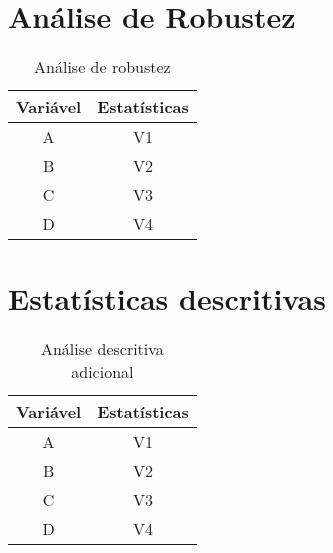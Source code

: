 \begin{apendicesenv}

\chapter{Análise de Robustez}

\begin{table}[H]
    \centering
    \caption{Análise de robustez}
    \begin{tabular}{c|c}
    \hline
         \textbf{Variável} & \textbf{Estatísticas}  \\ \hline
         A & V1\\
         B & V2\\
         C & V3\\
         D & V4\\ \hline
    \end{tabular}
    \label{tab:my_tab1}
\end{table}


\chapter{Estatísticas descritivas}

\begin{table}[H]
    \centering
    \caption{Análise descritiva adicional}
    \begin{tabular}{c|c}
    \hline
         \textbf{Variável} & \textbf{Estatísticas}  \\ \hline
         A & V1\\
         B & V2\\
         C & V3\\
         D & V4\\ \hline
    \end{tabular}
    \label{tab:my_tab2}
\end{table}

\end{apendicesenv}